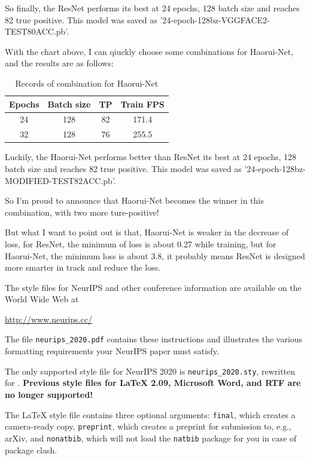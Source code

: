 \documentclass{article}
\begin{document}
So finally, the ResNet performs its best at 24 epochs, 128 batch size and reaches 82 true positive. This model was saved as  '24-epoch-128bz-VGGFACE2-TEST80ACC.pb'.

With the chart above, I can qiuckly choose some combinations for Haorui-Net, and the results are as follows:

\begin{table}[!htbp]
\centering
\caption{Records of combination for Haorui-Net}\label{tab:aStrangeTable}%
\begin{tabular}{cccc}
\toprule
Epochs & Batch size& TP &Train FPS\\
\midrule
24 & 128 & 82 & 171.4\\
32 & 128 & 76 & 255.5\\
\bottomrule
\end{tabular}
\end{table}

Luckily, the Haorui-Net performs better than ResNet its best at 24 epochs, 128 batch size and reaches 82 true positive. This model was saved as  '24-epoch-128bz-MODIFIED-TEST82ACC.pb'.

So I'm proud to announce that Haorui-Net becomes the winner in this combination, with two more ture-positive!

But what I want to point out is that, Haorui-Net is weaker in the decrease of loss, for ResNet, the minimum of loss is about 0.27 while training, but for Haorui-Net, the minimum loss is about 3.8, it probably means ResNet is designed more smarter in track and reduce the loss.


The style files for NeurIPS and other conference information are available on
the World Wide Web at
\begin{center}
  \url{http://www.neurips.cc/}
\end{center}
The file \verb+neurips_2020.pdf+ contains these instructions and illustrates the
various formatting requirements your NeurIPS paper must satisfy.

The only supported style file for NeurIPS 2020 is \verb+neurips_2020.sty+,
rewritten for \LaTeXe{}.  \textbf{Previous style files for \LaTeX{} 2.09,
  Microsoft Word, and RTF are no longer supported!}

The \LaTeX{} style file contains three optional arguments: \verb+final+, which
creates a camera-ready copy, \verb+preprint+, which creates a preprint for
submission to, e.g., arXiv, and \verb+nonatbib+, which will not load the
\verb+natbib+ package for you in case of package clash.
\end{document}
